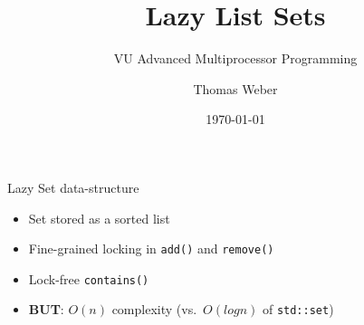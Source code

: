 \documentclass[aspectratio=43]{beamer}
\begin{document}
\title{Lazy List Sets}
\subtitle{VU Advanced Multiprocessor Programming}
\author{Thomas Weber}
\date{\today}

\begin{frame}[plain] 
  \titlepage
\end{frame}

\begin{frame}{Lazy Set data-structure}
  \begin{itemize}
  \item{Set stored as a sorted list}
  \item{Fine-grained locking in \texttt{add()} and \texttt{remove()}}
  \item{Lock-free \texttt{contains()}}
  \end{itemize}
  
  \begin{itemize}
  \item{\textbf{BUT}: $O(n)$ complexity (vs.\ $O({log} n)$ of \texttt{std::set})}
  \end{itemize}

\end{frame}
\end{document}
